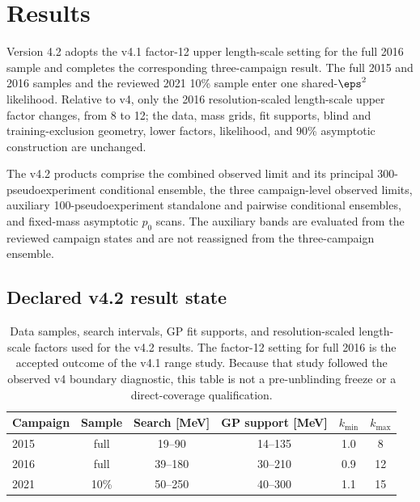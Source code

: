 \providecommand{\VFourPTwoLocalPZeroMinimum}{\ensuremath{3.25918\times10^{-5}}}
\providecommand{\VFourPTwoLocalPZeroMass}{\SI{65}{MeV}}
\providecommand{\VFourPTwoLocalZ}{\ensuremath{3.99321}}
\providecommand{\VFourPTwoEffectiveTrials}{\ensuremath{35.3814}}
\providecommand{\VFourPTwoSidakValue}{\ensuremath{0.00115250}}
\providecommand{\VFourPTwoSidakZ}{\ensuremath{3.04783}}
\providecommand{\VFourPTwoEpsHat}{\ensuremath{6.42706\times10^{-6}}}
\providecommand{\VFourPTwoEpsHatSigma}{\ensuremath{1.61009\times10^{-6}}}

\section{Results}
\label{sec:results}

Version 4.2 adopts the v4.1 factor-12 upper length-scale setting for the full
2016 sample and completes the corresponding three-campaign result. The full 2015
and 2016 samples and the reviewed 2021 10\% sample enter one shared-$\eps^2$
likelihood. Relative to v4, only the 2016 resolution-scaled length-scale upper
factor changes, from 8 to 12; the data, mass grids, fit supports, blind and
training-exclusion geometry, lower factors, likelihood, and 90\% asymptotic
\CLs{} construction are unchanged.

The v4.2 products comprise the combined observed limit and its principal
300-pseudoexperiment conditional ensemble, the three campaign-level observed
limits, auxiliary 100-pseudoexperiment standalone and pairwise conditional
ensembles, and fixed-mass asymptotic $p_0$ scans. The auxiliary bands are
evaluated from the reviewed campaign states and are not reassigned from the
three-campaign ensemble.

\subsection{Declared v4.2 result state}
\label{sec:results-v4p2-analysis-state}

\begin{table}[H]
\centering
\small
{\setlength{\tabcolsep}{5pt}
\begin{tabular}{lccccc}
\toprule
Campaign & Sample & Search [MeV] & GP support [MeV] &
$k_{\min}$ & $k_{\max}$ \\
\midrule
2015 & full & 19--90  & 14--135 & 1.0 & 8 \\
2016 & full & 39--180 & 30--210 & 0.9 & 12 \\
2021 & 10\% & 50--250 & 40--300 & 1.1 & 15 \\
\bottomrule
\end{tabular}
}
\caption{Data samples, search intervals, GP fit supports, and
resolution-scaled length-scale factors used for the v4.2 results. The factor-12
setting for full 2016 is the accepted outcome of the v4.1 range study. Because
that study followed the observed v4 boundary diagnostic, this table is not a
pre-unblinding freeze or a direct-coverage qualification.}
\label{tab:results-v4p2-configuration}
\end{table}

